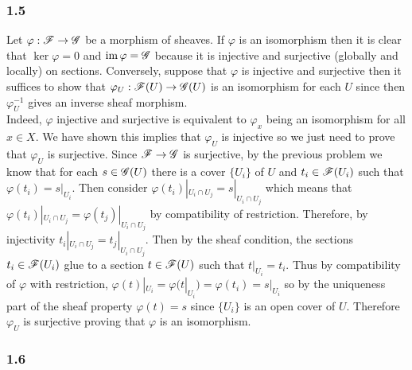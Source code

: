 \documentclass[12pt]{article}
\begin{document}
\subsubsection{1.5}

Let $\varphi : \mathscr{F} \to \mathscr{G}$ be a morphism of sheaves. If $\varphi$ is an isomorphism then it is clear that $\ker{\varphi} = 0$ and $\operatorname{\mathrm{im}}{\varphi} = \mathscr{G}$ because it is injective and surjective (globally and locally) on sections. Conversely, suppose that $\varphi$ is injective and surjective then it suffices to show that $\varphi_U : \mathscr{F}(U) \to \mathscr{G}(U)$ is an isomorphism for each $U$ since then $\varphi_U^{-1}$ gives an inverse sheaf morphism.
\bigskip\\
Indeed, $\varphi$ injective and surjective is equivalent to $\varphi_x$ being an isomorphism for all $x \in X$. We have shown this implies that $\varphi_U$ is injective so we just need to prove that $\varphi_U$ is surjective. Since $\mathscr{F} \to \mathscr{G}$ is surjective, by the previous problem we know that for each $s \in \mathscr{G}(U)$ there is a cover $\{ U_i \}$ of $U$ and $t_i \in \mathscr{F}(U_i)$ such that $\varphi(t_i) = s|_{U_i}$. Then consider $\varphi(t_i)|_{U_i \cap U_j} = s|_{U_i \cap U_j}$ which means that $\varphi(t_i)|_{U_i \cap U_j} = \varphi(t_j)|_{U_i \cap U_j}$ by compatibility of restriction. Therefore, by injectivity $t_i |_{U_i \cap U_j} = t_j |_{U_i \cap U_j}$. Then by the sheaf condition, the sections $t_i \in \mathscr{F}(U_i)$ glue to a section $t \in \mathscr{F}(U)$ such that $t|_{U_i} = t_i$. Thus by compatibility of $\varphi$ with restriction, $\varphi(t)|_{U_i} = \varphi(t|_{U_i}) = \varphi(t_i) = s|_{U_i}$ so by the uniqueness part of the sheaf property $\varphi(t) = s$ since $\{ U_i \}$ is an open cover of $U$. Therefore $\varphi_U$ is surjective proving that $\varphi$ is an isomorphism. 

\subsubsection{1.6}
\end{document}
